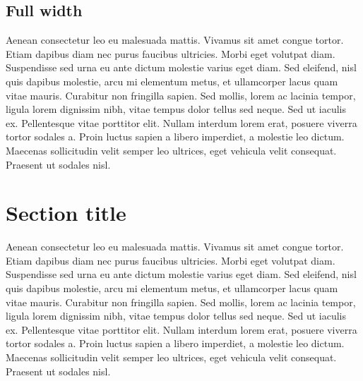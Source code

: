 \documentclass{tufte-handout}
\begin{document}
	\begin{fullwidth}
		
		\section{Full width}
		
		Aenean consectetur leo eu malesuada mattis. Vivamus sit amet congue tortor. Etiam dapibus diam nec purus faucibus ultricies. Morbi eget volutpat diam. Suspendisse sed urna eu ante dictum molestie varius eget diam. Sed eleifend, nisl quis dapibus molestie, arcu mi elementum metus, et ullamcorper lacus quam vitae mauris. Curabitur non fringilla sapien. Sed mollis, lorem ac lacinia tempor, ligula lorem dignissim nibh, vitae tempus dolor tellus sed neque. Sed ut iaculis ex. Pellentesque vitae porttitor elit. Nullam interdum lorem erat, posuere viverra tortor sodales a. Proin luctus sapien a libero imperdiet, a molestie leo dictum. Maecenas sollicitudin velit semper leo ultrices, eget vehicula velit consequat. Praesent ut sodales nisl.
	
	\end{fullwidth}
	
	\section{Section title}
	
	Aenean consectetur leo eu malesuada mattis. Vivamus sit amet congue tortor. Etiam dapibus diam nec purus faucibus ultricies. Morbi eget volutpat diam. Suspendisse sed urna eu ante dictum molestie varius eget diam. Sed eleifend, nisl quis dapibus molestie, arcu mi elementum metus, et ullamcorper lacus quam vitae mauris. Curabitur non fringilla sapien. Sed mollis, lorem ac lacinia tempor, ligula lorem dignissim nibh, vitae tempus dolor tellus sed neque. Sed ut iaculis ex. Pellentesque vitae porttitor elit. Nullam interdum lorem erat, posuere viverra tortor sodales a. Proin luctus sapien a libero imperdiet, a molestie leo dictum. Maecenas sollicitudin velit semper leo ultrices, eget vehicula velit consequat. Praesent ut sodales nisl.
		
	
	
\end{document}
